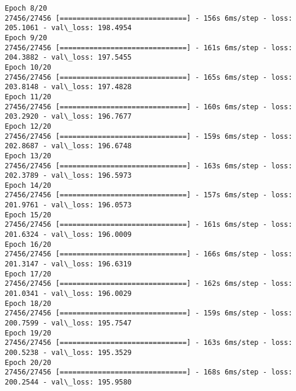 \documentclass[11pt]{article}
\begin{document}
\begin{Verbatim}[commandchars=\\\{\}]
Epoch 8/20
27456/27456 [==============================] - 156s 6ms/step - loss: 205.1061 - val\_loss: 198.4954
Epoch 9/20
27456/27456 [==============================] - 161s 6ms/step - loss: 204.3882 - val\_loss: 197.5455
Epoch 10/20
27456/27456 [==============================] - 165s 6ms/step - loss: 203.8148 - val\_loss: 197.4828
Epoch 11/20
27456/27456 [==============================] - 160s 6ms/step - loss: 203.2920 - val\_loss: 196.7677
Epoch 12/20
27456/27456 [==============================] - 159s 6ms/step - loss: 202.8687 - val\_loss: 196.6748
Epoch 13/20
27456/27456 [==============================] - 163s 6ms/step - loss: 202.3789 - val\_loss: 196.5973
Epoch 14/20
27456/27456 [==============================] - 157s 6ms/step - loss: 201.9761 - val\_loss: 196.0573
Epoch 15/20
27456/27456 [==============================] - 161s 6ms/step - loss: 201.6324 - val\_loss: 196.0009
Epoch 16/20
27456/27456 [==============================] - 166s 6ms/step - loss: 201.3147 - val\_loss: 196.6319
Epoch 17/20
27456/27456 [==============================] - 162s 6ms/step - loss: 201.0341 - val\_loss: 196.0029
Epoch 18/20
27456/27456 [==============================] - 159s 6ms/step - loss: 200.7599 - val\_loss: 195.7547
Epoch 19/20
27456/27456 [==============================] - 163s 6ms/step - loss: 200.5238 - val\_loss: 195.3529
Epoch 20/20
27456/27456 [==============================] - 168s 6ms/step - loss: 200.2544 - val\_loss: 195.9580

    \end{Verbatim}
\end{document}
